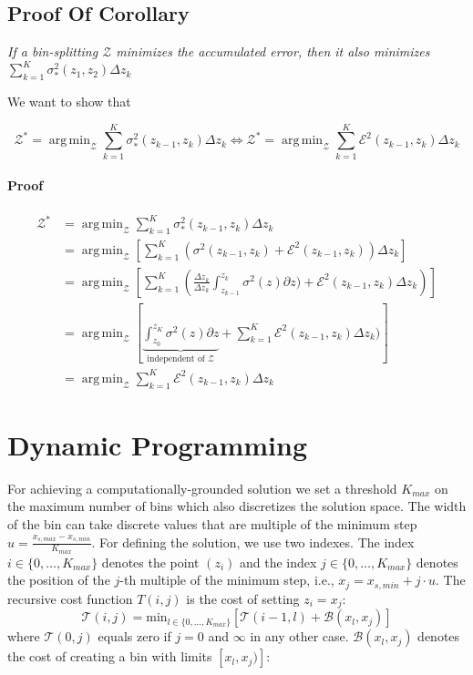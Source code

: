 \documentclass[twoside]{article}
\DeclareMathOperator*{\argmin}{arg\,min}
\begin{document}
\subsection{Proof Of Corollary}

\textit{ If a bin-splitting \(\mathcal{Z}\) minimizes the accumulated error, then it also minimizes
  \(\sum_{k=1}^K\sigma_*^2(z_1, z_2) \Delta z_k \)}

We want to show that

\[ \mathcal{Z}^* = \argmin_{\mathcal{Z}} \sum_{k=1}^K \sigma_*^2(z_{k-1}, z_k) \Delta z_k \Leftrightarrow \mathcal{Z}^* = \argmin_{\mathcal{Z}} \sum_{k=1}^K \mathcal{E}^2(z_{k-1}, z_k) \Delta z_k \]

\paragraph{Proof}

\begin{align}
  \mathcal{Z}^* &= \argmin_{\mathcal{Z}} \sum_{k=1}^K \sigma_*^2(z_{k-1}, z_k) \Delta z_k \\
                & = \argmin_{\mathcal{Z}} \left [ \sum_{k=1}^K (\sigma^2(z_{k-1}, z_k) + \mathcal{E}^2(z_{k-1}, z_k)) \Delta z_k \right ] \\
                & = \argmin_{\mathcal{Z}} \left [ \sum_{k=1}^K \left ( \frac{\Delta z_k}{\Delta z_k} \int_{z_{k-1}}^{z_k} \sigma^2(z) \partial z)   + \mathcal{E}^2(z_{k-1}, z_k) \Delta z_k \right ) \right ] \\
                & = \argmin_{\mathcal{Z}} \left [ \underbrace{\int_{z_0}^{z_K} \sigma^2(z) \partial z}_{\text{independent of } \mathcal{Z}}   + \sum_{k=1}^K\mathcal{E}^2(z_{k-1}, z_k) \Delta z_k) \right ] \\
                & = \argmin_{\mathcal{Z}} \sum_{k=1}^K\mathcal{E}^2(z_{k-1}, z_k) \Delta z_k
  \end{align}

\section{Dynamic Programming}
\label{sec:dynamic-programming}

For achieving a computationally-grounded solution we set a threshold
\(K_{max}\) on the maximum number of bins which also discretizes the
solution space. The width of the bin can take discrete values that are
multiple of the minimum step
\(u = \frac{x_{s, max} - x_{s, min}}{K_{max}}\). For defining the
solution, we use two indexes. The index
\(i \in \{0, \ldots, K_{max}\}\) denotes the point \((z_i)\) and the
index \(j \in \{0, \ldots, K_{max}\} \) denotes the position of the
\(j\)-th multiple of the minimum step, i.e.,
\(x_j = x_{s,min} + j \cdot u\). The recursive cost function
\(T(i,j)\) is the cost of setting \(z_i=x_j\):
\begin{equation}
  \label{eq:recursive_cost}
  \mathcal{T}(i,j) = \mathrm{min}_{l \in \{0, \ldots, K_{max}\}} \left [ \mathcal{T}(i-1, l) + \mathcal{B}(x_l, x_j) \right ]
\end{equation}
%
where \(\mathcal{T}(0,j)\) equals zero if \(j=0\) and \(\infty\) in
any other case. \(\mathcal{B}(x_l, x_j)\) denotes the cost of creating a bin
with limits \([x_l, x_j)]\):
\end{document}
